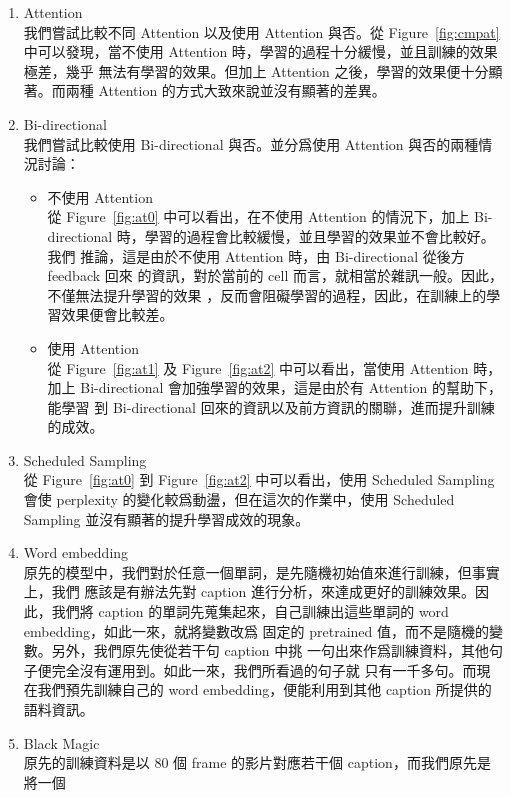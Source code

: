 \documentclass[12pt, a4paper]{article}
\theoremstyle{mystyle}	%
\begin{document}
\begin{enumerate}
\item Attention \\
  我們嘗試比較不同 Attention 以及使用 Attention 與否。從 Figure~\ref{fig:cmpat}
  中可以發現，當不使用 Attention 時，學習的過程十分緩慢，並且訓練的效果極差，幾乎
  無法有學習的效果。但加上 Attention 之後，學習的效果便十分顯著。而兩種 Attention
  的方式大致來說並沒有顯著的差異。
\item Bi-directional \\
  我們嘗試比較使用 Bi-directional 與否。並分爲使用 Attention 與否的兩種情況討論：
  \begin{itemize}
  \item 不使用 Attention\\
    從 Figure~\ref{fig:at0} 中可以看出，在不使用 Attention 的情況下，加上
    Bi-directional 時，學習的過程會比較緩慢，並且學習的效果並不會比較好。我們
    推論，這是由於不使用 Attention 時，由 Bi-directional 從後方 feedback 回來
    的資訊，對於當前的 cell 而言，就相當於雜訊一般。因此，不僅無法提升學習的效果
    ，反而會阻礙學習的過程，因此，在訓練上的學習效果便會比較差。
  \item 使用 Attention \\
    從 Figure~\ref{fig:at1} 及 Figure~\ref{fig:at2} 中可以看出，當使用 Attention 時，
    加上 Bi-directional 會加強學習的效果，這是由於有 Attention 的幫助下，能學習
    到 Bi-directional 回來的資訊以及前方資訊的關聯，進而提升訓練的成效。
  \end{itemize}
\item Scheduled Sampling \\
  從 Figure~\ref{fig:at0} 到 Figure~\ref{fig:at2} 中可以看出，使用 Scheduled Sampling
  會使 perplexity 的變化較爲動盪，但在這次的作業中，使用 Scheduled Sampling
  並沒有顯著的提升學習成效的現象。
\item Word embedding \\
  原先的模型中，我們對於任意一個單詞，是先隨機初始值來進行訓練，但事實上，我們
  應該是有辦法先對 caption 進行分析，來達成更好的訓練效果。因此，我們將 caption
  的單詞先蒐集起來，自己訓練出這些單詞的 word embedding，如此一來，就將變數改爲
  固定的 pretrained 值，而不是隨機的變數。另外，我們原先使從若干句 caption 中挑
  一句出來作爲訓練資料，其他句子便完全沒有運用到。如此一來，我們所看過的句子就
  只有一千多句。而現在我們預先訓練自己的 word embedding，便能利用到其他 caption
  所提供的語料資訊。
\item Black Magic \\
  原先的訓練資料是以 80 個 frame 的影片對應若干個 caption，而我們原先是將一個

\end{enumerate}
\end{document}
